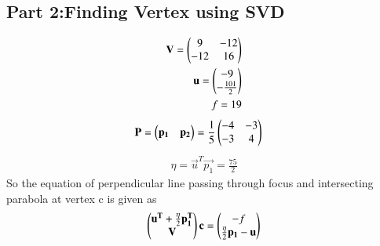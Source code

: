 \documentclass[journal,12pt,twocolumn]{IEEEtran}
\begin{document}
\subsection{Part 2:Finding Vertex using SVD}
\begin{align}
\label{eq V}\mathbf{V} = \begin{pmatrix}9&-12\\-12&16\end{pmatrix}\\ 
\label{eq U} \mathbf{u} = \begin{pmatrix}-9\\-\frac{101}{2}\end{pmatrix}\\ 
f = 19 \label{eq f}
\end{align}
\begin{align}
\mathbf{P}&=\begin{pmatrix}\mathbf{p_1}&\mathbf{p_2}\end{pmatrix}=\frac{1}{5}\begin{pmatrix}-4&-3\\ -3 &4\end{pmatrix}\label{eq P}    
\end{align}
\begin{align}
\eta=\vec{u}^T\vec{p_1}=\frac{75}{2}
\end{align}
So the equation of perpendicular line passing through focus and intersecting parabola at vertex c is given as
\begin{align}
\begin{pmatrix}\mathbf{u^T}+\frac{\eta}{2}\mathbf{p_1^T} \\ \mathbf{V}\end{pmatrix}\mathbf{c}=
\begin{pmatrix}-f \\ \frac{\eta}{2}\mathbf{p_1}-\mathbf{u}\end{pmatrix} 
\end{align}
\end{document}
